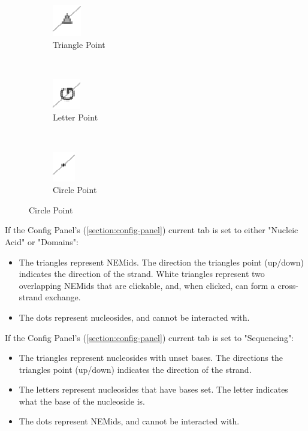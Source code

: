 \documentclass[titlepage]{article}
\begin{document}
	\begin{figure}[h]
		\centering
		\caption{Side View Plot Point Graphics}
		\label{fig:side-view-plot-point-graphics}
		
		\begin{subfigure}{.3\linewidth}
			\centering
			\includegraphics[width=.3in]{up-triangle.png}
			\caption{Triangle Point}
			\label{fig:up-triangle}
		\end{subfigure}%
 		~
		\begin{subfigure}{.3\linewidth}
			\centering
			\includegraphics[width=.3in]{base-symbol.png}
			\caption{Letter Point}
			\label{fig:base-symbol}
		\end{subfigure}%
		~
		\begin{subfigure}{.3\linewidth}
			\centering
			\includegraphics[width=.3in]{nondominant-point.png}
			\caption{Circle Point}
			\label{fig:nondominant-point}
		\end{subfigure}
	\end{figure}

	If the Config Panel's (\ref{section:config-panel}) current tab is set to either "Nucleic Acid" or "Domains":
	\begin{itemize}
		\item The triangles represent NEMids. The direction the triangles point (up/down) indicates the direction of the strand. White triangles represent two overlapping NEMids that are clickable, and, when clicked, can form a cross-strand exchange.
		\item The dots represent nucleosides, and cannot be interacted with.
	\end{itemize}

	If the Config Panel's (\ref{section:config-panel}) current tab is set to "Sequencing":
	\begin{itemize}
		\item The triangles represent nucleosides with unset bases. The directions the triangles point (up/down) indicates the direction of the strand.
		\item The letters represent nucleosides that have bases set. The letter indicates what the base of the nucleoside is. 
		\item The dots represent NEMids, and cannot be interacted with.
	\end{itemize}
\end{document}
